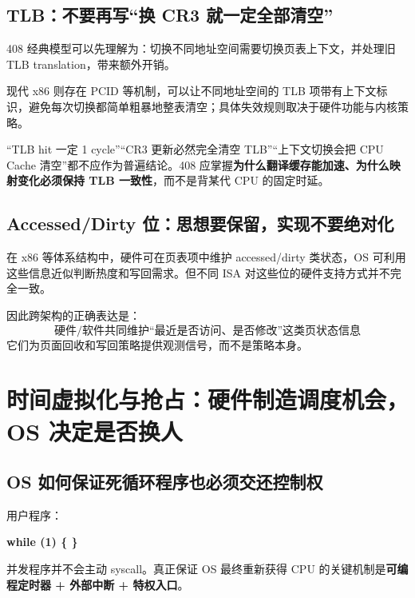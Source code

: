 \documentclass[11pt,a4paper]{ctexart}
\newcommand{\kw}[1]{\textbf{#1}}
\begin{document}
\subsection{TLB：不要再写“换 CR3 就一定全部清空”}
408 经典模型可以先理解为：切换不同地址空间需要切换页表上下文，并处理旧 TLB translation，带来额外开销。

现代 x86 则存在 PCID 等机制，可以让不同地址空间的 TLB 项带有上下文标识，避免每次切换都简单粗暴地整表清空；具体失效规则取决于硬件功能与内核策略。

\begin{warn}[边界修正]
“TLB hit 一定 1 cycle”“CR3 更新必然完全清空 TLB”“上下文切换会把 CPU Cache 清空”都不应作为普遍结论。408 应掌握\kw{为什么翻译缓存能加速、为什么映射变化必须保持 TLB 一致性}，而不是背某代 CPU 的固定时延。
\end{warn}

\subsection{Accessed/Dirty 位：思想要保留，实现不要绝对化}
在 x86 等体系结构中，硬件可在页表项中维护 accessed/dirty 类状态，OS 可利用这些信息近似判断热度和写回需求。但不同 ISA 对这些位的硬件支持方式并不完全一致。

因此跨架构的正确表达是：
\[
\boxed{\text{硬件/软件共同维护“最近是否访问、是否修改”这类页状态信息}}
\]
它们为页面回收和写回策略提供观测信号，而不是策略本身。

\section{时间虚拟化与抢占：硬件制造调度机会，OS 决定是否换人}

\subsection{OS 如何保证死循环程序也必须交还控制权}
用户程序：
\begin{center}

\begingroup
\large\ttfamily\bfseries
while (1) \{ \}
\endgroup
\end{center}

并发程序并不会主动 syscall。真正保证 OS 最终重新获得 CPU 的关键机制是\kw{可编程定时器 + 外部中断 + 特权入口}。
\end{document}
